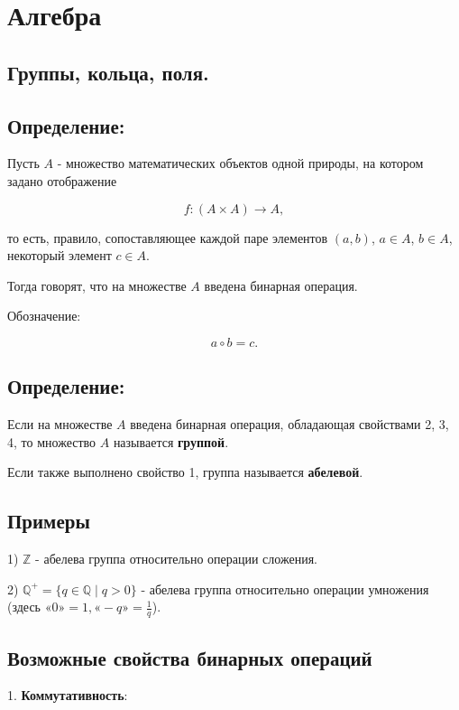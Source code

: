 {
\section{Алгебра}
\subsection{Группы, кольца, поля.}
\subsection*{Определение:}

Пусть \( A \) - множество математических объектов одной природы, на котором задано отображение 



\[
f: (A \times A) \to A,
\]



то есть, правило, сопоставляющее каждой паре элементов \( (a, b) \), \( a \in A \), \( b \in A \), некоторый элемент \( c \in A \). 

Тогда говорят, что на множестве \( A \) введена бинарная операция. 

Обозначение: 


\[
a \circ b = c.
\]

\subsection*{Определение:}

Если на множестве \( A \) введена бинарная операция, обладающая свойствами 2, 3, 4, то множество \( A \) называется \textbf{группой}.

Если также выполнено свойство 1, группа называется \textbf{абелевой}.

\subsection*{Примеры}

1) \( \mathbb{Z} \) - абелева группа относительно операции сложения.

2) \( \mathbb{Q}^+ = \{q \in \mathbb{Q} \mid q > 0\} \) - абелева группа относительно операции умножения 
(здесь \(«0» = 1, «-q» = \frac{1}{q} \)).

\subsection*{Возможные свойства бинарных операций}

1. \textbf{Коммутативность}:


}
